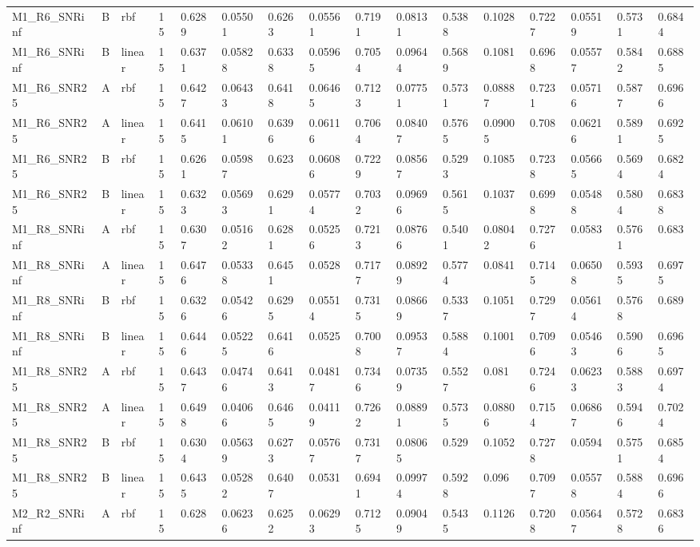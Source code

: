 \begin{tabular}{llllllllllllllll}
M1\_R6\_SNRinf & B & rbf & 15 & 0.6289 & 0.05501 & 0.6263 & 0.05561 & 0.7191 & 0.08131 & 0.5388 & 0.1028 & 0.7227 & 0.05519 & 0.5731 & 0.6844 \\
M1\_R6\_SNRinf & B & linear & 15 & 0.6371 & 0.05828 & 0.6338 & 0.05965 & 0.7054 & 0.09644 & 0.5689 & 0.1081 & 0.6968 & 0.05577 & 0.5842 & 0.6885 \\
M1\_R6\_SNR25 & A & rbf & 15 & 0.6427 & 0.06433 & 0.6418 & 0.06465 & 0.7123 & 0.07751 & 0.5731 & 0.08887 & 0.7231 & 0.05716 & 0.5877 & 0.6966 \\
M1\_R6\_SNR25 & A & linear & 15 & 0.6415 & 0.06101 & 0.6396 & 0.06116 & 0.7064 & 0.08407 & 0.5765 & 0.09005 & 0.708 & 0.06216 & 0.5891 & 0.6925 \\
M1\_R6\_SNR25 & B & rbf & 15 & 0.6261 & 0.05987 & 0.623 & 0.06086 & 0.7229 & 0.08567 & 0.5293 & 0.1085 & 0.7238 & 0.05665 & 0.5694 & 0.6824 \\
M1\_R6\_SNR25 & B & linear & 15 & 0.6323 & 0.05693 & 0.6291 & 0.05774 & 0.7032 & 0.09696 & 0.5615 & 0.1037 & 0.6998 & 0.05488 & 0.5804 & 0.6838 \\
M1\_R8\_SNRinf & A & rbf & 15 & 0.6307 & 0.05162 & 0.6281 & 0.05256 & 0.7213 & 0.08766 & 0.5401 & 0.08042 & 0.7276 & 0.0583 & 0.5761 & 0.683 \\
M1\_R8\_SNRinf & A & linear & 15 & 0.6476 & 0.05338 & 0.6451 & 0.0528 & 0.7177 & 0.08929 & 0.5774 & 0.0841 & 0.7145 & 0.06508 & 0.5935 & 0.6975 \\
M1\_R8\_SNRinf & B & rbf & 15 & 0.6326 & 0.05426 & 0.6295 & 0.05514 & 0.7315 & 0.08669 & 0.5337 & 0.1051 & 0.7297 & 0.05614 & 0.5768 & 0.689 \\
M1\_R8\_SNRinf & B & linear & 15 & 0.6446 & 0.05225 & 0.6416 & 0.0525 & 0.7008 & 0.09537 & 0.5884 & 0.1001 & 0.7096 & 0.05463 & 0.5906 & 0.6965 \\
M1\_R8\_SNR25 & A & rbf & 15 & 0.6437 & 0.04746 & 0.6413 & 0.04817 & 0.7346 & 0.07359 & 0.5527 & 0.081 & 0.7246 & 0.06233 & 0.5883 & 0.6974 \\
M1\_R8\_SNR25 & A & linear & 15 & 0.6498 & 0.04066 & 0.6465 & 0.04119 & 0.7262 & 0.08891 & 0.5735 & 0.08806 & 0.7154 & 0.06867 & 0.5946 & 0.7024 \\
M1\_R8\_SNR25 & B & rbf & 15 & 0.6304 & 0.05639 & 0.6273 & 0.05767 & 0.7317 & 0.08065 & 0.529 & 0.1052 & 0.7278 & 0.0594 & 0.5751 & 0.6854 \\
M1\_R8\_SNR25 & B & linear & 15 & 0.6435 & 0.05282 & 0.6407 & 0.0531 & 0.6941 & 0.09974 & 0.5928 & 0.096 & 0.7097 & 0.05578 & 0.5884 & 0.6966 \\
M2\_R2\_SNRinf & A & rbf & 15 & 0.628 & 0.06236 & 0.6252 & 0.06293 & 0.7125 & 0.09049 & 0.5435 & 0.1126 & 0.7208 & 0.05647 & 0.5728 & 0.6836 \\

\end{tabular}
